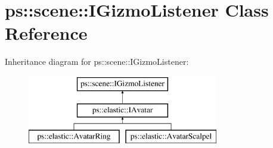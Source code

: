 \hypertarget{classps_1_1scene_1_1IGizmoListener}{}\section{ps\+:\+:scene\+:\+:I\+Gizmo\+Listener Class Reference}
\label{classps_1_1scene_1_1IGizmoListener}
Inheritance diagram for ps\+:\+:scene\+:\+:I\+Gizmo\+Listener\+:\begin{figure}[H]
\begin{center}
\leavevmode
\includegraphics[height=3.000000cm]{classps_1_1scene_1_1IGizmoListener}
\end{center}
\end{figure}
